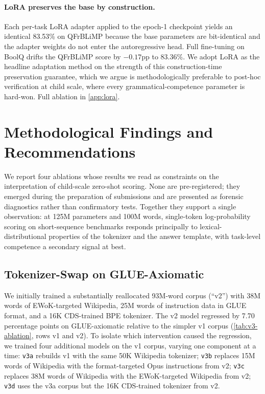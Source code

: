 \documentclass[11pt]{article}
\begin{document}
\paragraph{LoRA preserves the base by construction.}
\label{sec:lora-preservation}
Each per-task LoRA adapter applied to the epoch-1 checkpoint yields an identical 83.53\% on QFrBLiMP because the base parameters are bit-identical and the adapter weights do not enter the autoregressive head. Full fine-tuning on BoolQ drifts the QFrBLiMP score by $-0.17$pp to 83.36\%. We adopt LoRA as the headline adaptation method on the strength of this construction-time preservation guarantee, which we argue is methodologically preferable to post-hoc verification at child scale, where every grammatical-competence parameter is hard-won. Full ablation in \autoref{app:lora}.

\section{Methodological Findings and Recommendations}
\label{sec:methodo}

We report four ablations whose results we read as constraints on the interpretation of child-scale zero-shot scoring. None are pre-registered; they emerged during the preparation of submissions and are presented as forensic diagnostics rather than confirmatory tests. Together they support a single observation: at 125M parameters and 100M words, single-token log-probability scoring on short-sequence benchmarks responds principally to lexical-distributional properties of the tokenizer and the answer template, with task-level competence a secondary signal at best.

\subsection{Tokenizer-Swap on GLUE-Axiomatic}
\label{sec:tokenizer-swap}

We initially trained a substantially reallocated 93M-word corpus (\enquote{v2}) with 38M words of EWoK-targeted Wikipedia, 25M words of instruction data in GLUE format, and a 16K CDS-trained BPE tokenizer. The v2 model regressed by 7.70 percentage points on GLUE-axiomatic relative to the simpler v1 corpus (\autoref{tab:v3-ablation}, rows v1 and v2). To isolate which intervention caused the regression, we trained four additional models on the v1 corpus, varying one component at a time: \texttt{v3a} rebuilds v1 with the same 50K Wikipedia tokenizer; \texttt{v3b} replaces 15M words of Wikipedia with the format-targeted Opus instructions from v2; \texttt{v3c} replaces 38M words of Wikipedia with the EWoK-targeted Wikipedia from v2; \texttt{v3d} uses the v3a corpus but the 16K CDS-trained tokenizer from v2.
\end{document}
